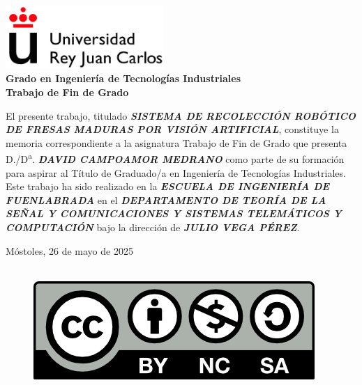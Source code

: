 

\thispagestyle{empty}
\begin{center}
    \includegraphics[width=0.45\textwidth]{figs/logo_urjc.jpg}\\[1cm]

    {\large{\textbf{Grado en Ingeniería de Tecnologías Industriales}}}\\[1cm]
    {\large{\textbf{Trabajo de Fin de Grado}}}\\[1cm]
\end{center}


El presente trabajo, titulado \textit{\textbf{SISTEMA DE RECOLECCIÓN ROBÓTICO DE FRESAS MADURAS POR VISIÓN ARTIFICIAL}}, constituye la memoria correspondiente a la asignatura Trabajo de Fin de Grado que presenta D./D\textsuperscript{a}. \textit{\textbf{DAVID CAMPOAMOR MEDRANO}} como parte de su formación para aspirar al Título de Graduado/a en Ingeniería de Tecnologías Industriales. Este trabajo ha sido realizado en la \textit{\textbf{ESCUELA DE INGENIERÍA DE FUENLABRADA}} en el \textit{\textbf{DEPARTAMENTO DE TEORÍA DE LA SEÑAL Y COMUNICACIONES Y SISTEMAS TELEMÁTICOS Y COMPUTACIÓN}} bajo la dirección de \textit{\textbf{JULIO VEGA PÉREZ}}.\\[3cm]

\begin{flushright}
Móstoles, 26 de mayo de 2025
\end{flushright}

\cleardoublepage

\begin{figure}
 \ \ \ \ \includegraphics[width=0.25\linewidth]{figs/by-nc-sa.png}
 \label{fig:cc} 
 \end{figure}

\

